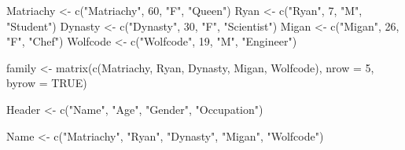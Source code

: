\documentclass[
]{article}
\newenvironment{Shaded}{\begin{snugshade}}{\end{snugshade}}
\newcommand{\AttributeTok}[1]{\textcolor[rgb]{0.77,0.63,0.00}{#1}}
\newcommand{\ConstantTok}[1]{\textcolor[rgb]{0.00,0.00,0.00}{#1}}
\newcommand{\DecValTok}[1]{\textcolor[rgb]{0.00,0.00,0.81}{#1}}
\newcommand{\FunctionTok}[1]{\textcolor[rgb]{0.00,0.00,0.00}{#1}}
\newcommand{\NormalTok}[1]{#1}
\newcommand{\OtherTok}[1]{\textcolor[rgb]{0.56,0.35,0.01}{#1}}
\newcommand{\StringTok}[1]{\textcolor[rgb]{0.31,0.60,0.02}{#1}}
\begin{document}
\begin{Shaded}
\begin{Highlighting}[]
\NormalTok{Matriachy }\OtherTok{\textless{}{-}} \FunctionTok{c}\NormalTok{(}\StringTok{"Matriachy"}\NormalTok{, }\DecValTok{60}\NormalTok{, }\StringTok{"F"}\NormalTok{, }\StringTok{"Queen"}\NormalTok{)}
\NormalTok{Ryan }\OtherTok{\textless{}{-}} \FunctionTok{c}\NormalTok{(}\StringTok{"Ryan"}\NormalTok{, }\DecValTok{7}\NormalTok{, }\StringTok{"M"}\NormalTok{, }\StringTok{"Student"}\NormalTok{)}
\NormalTok{Dynasty }\OtherTok{\textless{}{-}} \FunctionTok{c}\NormalTok{(}\StringTok{"Dynasty"}\NormalTok{, }\DecValTok{30}\NormalTok{, }\StringTok{"F"}\NormalTok{, }\StringTok{"Scientist"}\NormalTok{)}
\NormalTok{Migan }\OtherTok{\textless{}{-}} \FunctionTok{c}\NormalTok{(}\StringTok{"Migan"}\NormalTok{, }\DecValTok{26}\NormalTok{, }\StringTok{"F"}\NormalTok{, }\StringTok{"Chef"}\NormalTok{)}
\NormalTok{Wolfcode }\OtherTok{\textless{}{-}} \FunctionTok{c}\NormalTok{(}\StringTok{"Wolfcode"}\NormalTok{, }\DecValTok{19}\NormalTok{, }\StringTok{"M"}\NormalTok{, }\StringTok{"Engineer"}\NormalTok{)}
\end{Highlighting}
\end{Shaded}

\begin{Shaded}
\begin{Highlighting}[]
\NormalTok{family }\OtherTok{\textless{}{-}} \FunctionTok{matrix}\NormalTok{(}\FunctionTok{c}\NormalTok{(Matriachy, Ryan, Dynasty, Migan, Wolfcode), }\AttributeTok{nrow =} \DecValTok{5}\NormalTok{, }\AttributeTok{byrow =} \ConstantTok{TRUE}\NormalTok{)}
\end{Highlighting}
\end{Shaded}

\begin{Shaded}
\begin{Highlighting}[]
\NormalTok{Header }\OtherTok{\textless{}{-}} \FunctionTok{c}\NormalTok{(}\StringTok{"Name"}\NormalTok{, }\StringTok{"Age"}\NormalTok{, }\StringTok{"Gender"}\NormalTok{, }\StringTok{"Occupation"}\NormalTok{)}
\end{Highlighting}
\end{Shaded}

\begin{Shaded}
\begin{Highlighting}[]
\NormalTok{Name }\OtherTok{\textless{}{-}} \FunctionTok{c}\NormalTok{(}\StringTok{"Matriachy"}\NormalTok{, }\StringTok{"Ryan"}\NormalTok{, }\StringTok{"Dynasty"}\NormalTok{, }\StringTok{"Migan"}\NormalTok{, }\StringTok{"Wolfcode"}\NormalTok{)}
\end{Highlighting}
\end{Shaded}
\end{document}
